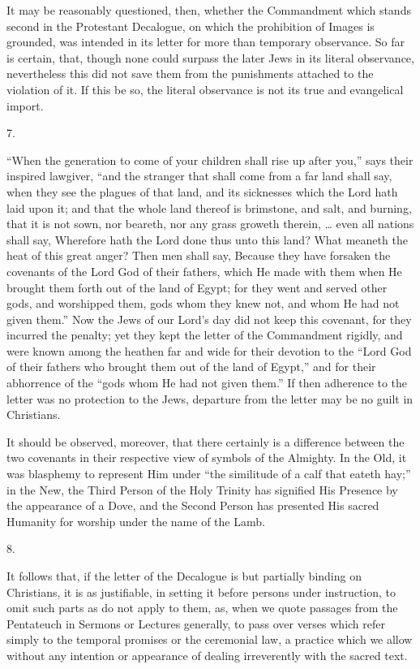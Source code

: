 It may be reasonably questioned, then, whether the Commandment
which stands second in the Protestant Decalogue, on which the
prohibition of Images is grounded, was intended in its letter for more
than temporary observance. So far is certain, that, though none could
surpass the later Jews in its literal observance, nevertheless this
did not save them from the punishments attached to the violation of
it. If this be so, the literal observance is not its true and
evangelical import.

7.

``When the generation to come of your children shall rise up
after you,'' says their inspired lawgiver, ``and the stranger
that shall come from a far land shall say, when they see the plagues
of that land, and its sicknesses which the Lord hath laid upon it; and
that the whole land thereof is brimstone, and salt, and burning, that
it is not sown, nor beareth, nor any grass groweth therein, … even
all nations shall say, Wherefore hath the Lord done thus unto this
land? What meaneth the heat of this great anger? Then men shall say,
Because they have forsaken the covenants of the Lord God of their
fathers, which He made with them when He brought them forth out of the
land of Egypt; for they went and served other gods, and worshipped
them, gods whom they knew not, and whom He had not given them.''
Now the Jews of our Lord's day did not keep this covenant, for they
incurred the penalty; yet they kept the letter of the Commandment
rigidly, and were known among the heathen far and wide for their
devotion to the ``Lord God of their fathers who brought them out
of the land of Egypt,'' and for their abhorrence of the ``gods
whom He had not given them.'' If then adherence to the letter was
no protection to the Jews, departure from the letter may be no guilt
in Christians.

It should be observed, moreover, that there certainly is a
difference between the two covenants in their respective view of
symbols of the Almighty. In the Old, it was blasphemy to represent Him
under ``the similitude of a calf that eateth hay;'' in the
New, the Third Person of the Holy Trinity has signified His Presence
by the appearance of a Dove, and the Second Person has presented His
sacred Humanity for worship under the name of the Lamb.

8.

It follows that, if the letter of the Decalogue is but partially
binding on Christians, it is as justifiable, in setting it before
persons under instruction, to omit such parts as do not apply to them,
as, when we quote passages from the Pentateuch in Sermons or Lectures
generally, to pass over verses which refer simply to the temporal
promises or the ceremonial law, a practice which we allow without any
intention or appearance of dealing irreverently with the sacred text.

